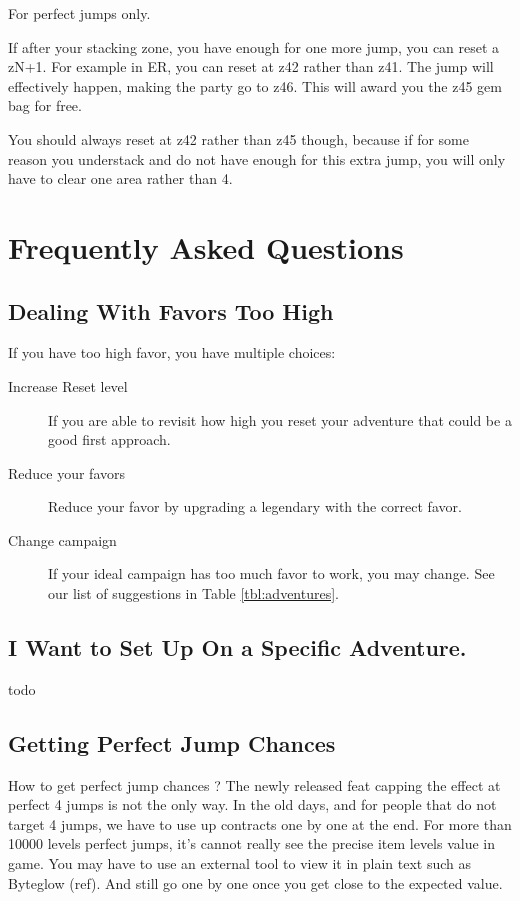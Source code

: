 \documentclass{article}
\begin{document}
For perfect jumps only.

If after your stacking zone, you have enough for one more jump, you can reset a zN+1.
For example in ER, you can reset at z42 rather than z41.
The jump will effectively happen, making the party go to z46.
This will award you the z45 gem bag for free.

You should always reset at z42 rather than z45 though, because if for some reason you understack and do not have enough for this extra jump, you will only have to clear one area rather than 4.



\section{Frequently Asked Questions}




\subsection{Dealing With Favors Too High}

If you have too high favor, you have multiple choices:
\begin{description}
    \item[Increase Reset level] If you are able to revisit how high you reset your adventure that could be a good first approach.
    \item[Reduce your favors] Reduce your favor by upgrading a legendary with the correct favor.
    \item[Change campaign] If your ideal campaign has too much favor to work, you may change.
    See our list of suggestions in Table \ref{tbl:adventures}.
\end{description}

\subsection{I Want to Set Up On a Specific Adventure.}

todo

\subsection{Getting Perfect Jump Chances}
\label{sec:upgradeIlvl}

How to get perfect jump chances ?
The newly released feat capping the effect at perfect 4 jumps is not the only way.
In the old days, and for people that do not target 4 jumps, we have to use up contracts one by one at the end.
For more than 10000 levels perfect jumps, it's cannot really see the precise item levels value in game.
You may have to use an external tool to view it in plain text such as Byteglow (ref).
And still go one by one once you get close to the expected value.
\end{document}
